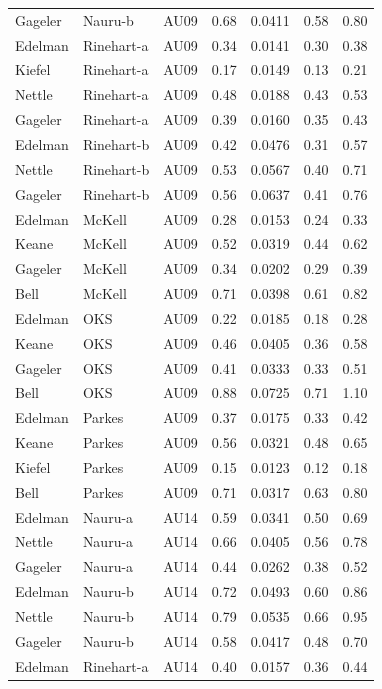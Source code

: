 \documentclass{monashthesis}
\begin{document}
\begin{center}
\begin{longtable}{lllllll}
Gageler & Nauru-b & AU09 & 0.68 & 0.0411 & 0.58 & 0.80 \\
Edelman & Rinehart-a & AU09 & 0.34 & 0.0141 & 0.30 & 0.38 \\
Kiefel & Rinehart-a & AU09 & 0.17 & 0.0149 & 0.13 & 0.21 \\
Nettle & Rinehart-a & AU09 & 0.48 & 0.0188 & 0.43 & 0.53 \\
Gageler & Rinehart-a & AU09 & 0.39 & 0.0160 & 0.35 & 0.43 \\
Edelman & Rinehart-b & AU09 & 0.42 & 0.0476 & 0.31 & 0.57 \\
Nettle & Rinehart-b & AU09 & 0.53 & 0.0567 & 0.40 & 0.71 \\
Gageler & Rinehart-b & AU09 & 0.56 & 0.0637 & 0.41 & 0.76 \\
Edelman & McKell & AU09 & 0.28 & 0.0153 & 0.24 & 0.33 \\
Keane & McKell & AU09 & 0.52 & 0.0319 & 0.44 & 0.62 \\
Gageler & McKell & AU09 & 0.34 & 0.0202 & 0.29 & 0.39 \\
Bell & McKell & AU09 & 0.71 & 0.0398 & 0.61 & 0.82 \\
Edelman & OKS & AU09 & 0.22 & 0.0185 & 0.18 & 0.28 \\
Keane & OKS & AU09 & 0.46 & 0.0405 & 0.36 & 0.58 \\
Gageler & OKS & AU09 & 0.41 & 0.0333 & 0.33 & 0.51 \\
Bell & OKS & AU09 & 0.88 & 0.0725 & 0.71 & 1.10 \\
Edelman & Parkes & AU09 & 0.37 & 0.0175 & 0.33 & 0.42 \\
Keane & Parkes & AU09 & 0.56 & 0.0321 & 0.48 & 0.65 \\
Kiefel & Parkes & AU09 & 0.15 & 0.0123 & 0.12 & 0.18 \\
Bell & Parkes & AU09 & 0.71 & 0.0317 & 0.63 & 0.80 \\
Edelman & Nauru-a & AU14 & 0.59 & 0.0341 & 0.50 & 0.69 \\
Nettle & Nauru-a & AU14 & 0.66 & 0.0405 & 0.56 & 0.78 \\
Gageler & Nauru-a & AU14 & 0.44 & 0.0262 & 0.38 & 0.52 \\
Edelman & Nauru-b & AU14 & 0.72 & 0.0493 & 0.60 & 0.86 \\
Nettle & Nauru-b & AU14 & 0.79 & 0.0535 & 0.66 & 0.95 \\
Gageler & Nauru-b & AU14 & 0.58 & 0.0417 & 0.48 & 0.70 \\
Edelman & Rinehart-a & AU14 & 0.40 & 0.0157 & 0.36 & 0.44 \\

\end{longtable}
\end{center}
\end{document}
